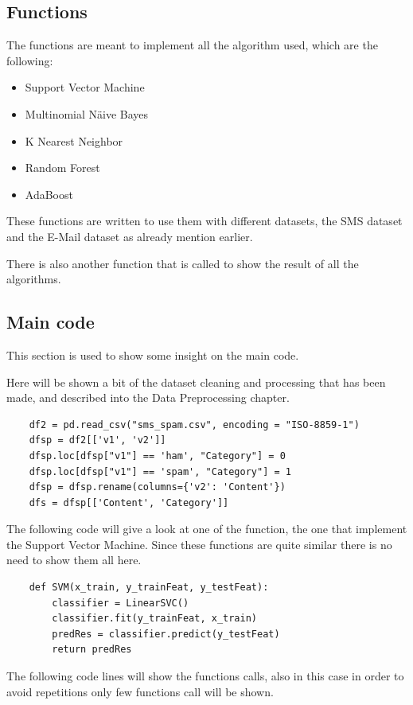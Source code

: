 \documentclass[a4paper]{report}
\begin{document}
\subsection{Functions}
The functions are meant to implement all the algorithm used, which are the following:
\begin{itemize}
	\item Support Vector Machine
	\item Multinomial Näive Bayes
	\item K Nearest Neighbor
	\item Random Forest
	\item AdaBoost
\end{itemize}

\noindent These functions are written to use them with different datasets, the SMS dataset and the E-Mail dataset as already mention earlier.

\noindent There is also another function that is called to show the result of all the algorithms.
\newpage
\subsection{Main code}
This section is used to show some insight on the main code.

\noindent Here will be shown a bit of the dataset cleaning and processing that has been made, and described into the Data Preprocessing chapter. 

\lstset{ language=json}
\begin{lstlisting}
	df2 = pd.read_csv("sms_spam.csv", encoding = "ISO-8859-1")
	dfsp = df2[['v1', 'v2']]
	dfsp.loc[dfsp["v1"] == 'ham', "Category"] = 0
	dfsp.loc[dfsp["v1"] == 'spam', "Category"] = 1
	dfsp = dfsp.rename(columns={'v2': 'Content'})
	dfs = dfsp[['Content', 'Category']]
\end{lstlisting}

\noindent The following code will give a look at one of the function, the one that implement the Support Vector Machine. Since these functions are quite similar there is no need to show them all here.

\lstset{ language=json}
\begin{lstlisting}
	def SVM(x_train, y_trainFeat, y_testFeat):
		classifier = LinearSVC()
		classifier.fit(y_trainFeat, x_train)
		predRes = classifier.predict(y_testFeat)
		return predRes
\end{lstlisting}

\noindent The following code lines will show the functions calls, also in this case in order to avoid repetitions only few functions call will be shown.
\end{document}
